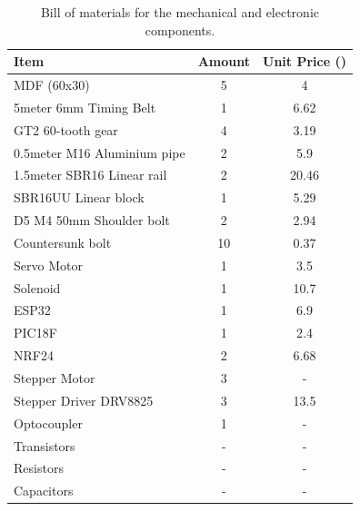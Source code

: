 \begin{table}[h]
	\centering
	\caption{Bill of materials for the mechanical and electronic components.}
	\label{tab:bill-of-materials}
	\begin{tabular}{|l|c|c|}
		\hline
		Item & Amount & Unit Price (\texteuro) \\
		\hline\hline
		MDF (60x30) & 5 & 4 \\ 
		\hline
		5meter 6mm Timing Belt & 1 & 6.62\\
		\hline
		GT2 60-tooth gear & 4 & 3.19\\
		\hline
		0.5meter M16 Aluminium pipe & 2 & 5.9\\
		\hline
		1.5meter SBR16 Linear rail & 2 & 20.46\\
		\hline
		SBR16UU Linear block & 1 & 5.29\\
		\hline
		D5 M4 50mm Shoulder bolt & 2 & 2.94\\
		\hline
		Countersunk bolt & 10 & 0.37\\
		\hline
		Servo Motor & 1 & 3.5 \\
		\hline
		Solenoid & 1 & 10.7 \\ 
		\hline
		ESP32 & 1 & 6.9 \\
		\hline
		PIC18F & 1 & 2.4 \\
		\hline
		NRF24 & 2 & 6.68 \\
		\hline
		Stepper Motor & 3 & - \\
		\hline
		Stepper Driver DRV8825 & 3 & 13.5 \\
		\hline
		Optocoupler & 1 & - \\
		\hline
		Transistors & - & - \\
		\hline
		Resistors & - & - \\
		\hline
		Capacitors & - & - \\
		\hline
	\end{tabular}
\end{table}